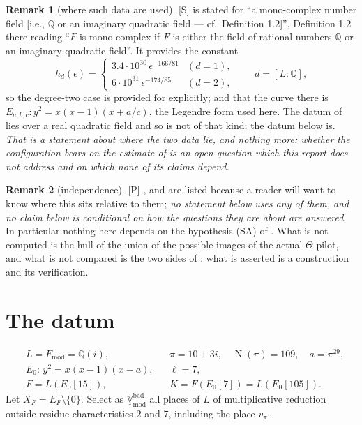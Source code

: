 \documentclass[11pt]{article}
\theoremstyle{plain}
\theoremstyle{definition}
\newtheorem{remark}{Remark}
\newcommand{\Fmod}{F_{\mathrm{mod}}}
\newcommand{\Vbad}{\underline{\mathbb{V}}^{\mathrm{bad}}}
\newcommand{\SA}{\textup{(SA)}}
\newcommand{\Norm}{\operatorname{N}}
\begin{document}
\begin{remark}[where such data are used]\label{r:mfhmp}
\textup{[S]} \cite[Thm.~A]{MFHMP} is stated for ``a mono-complex number field
[i.e., $\mathbb{Q}$ or an imaginary quadratic field --- cf.\ Definition 1.2]'',
Definition 1.2 there reading ``$F$ is mono-complex if $F$ is either the field of
rational numbers $\mathbb{Q}$ or an imaginary quadratic field''.  It provides the
constant
\[
 h_d(\epsilon)=
 \begin{cases}
  3.4\cdot10^{30}\,\epsilon^{-166/81} & (d=1),\\
  6\cdot10^{31}\,\epsilon^{-174/85} & (d=2),
 \end{cases}
 \qquad d=[L:\mathbb{Q}],
\]
so the degree-two case is provided for explicitly; and that the curve there is
$E_{a,b,c}:y^2=x(x-1)(x+a/c)$, the Legendre form used here.  The datum of
\cite{First} lies over a real quadratic field and so is not of that kind; the datum
below is.  \emph{That is a statement about where the two data lie, and nothing more:
whether the configuration bears on the estimate of \cite[Thm.~A]{MFHMP} is an open
question which this report does not address and on which none of its claims depend.}
\end{remark}

\begin{remark}[independence]\label{r:indep}
\textup{[P]} \cite{SS}, \cite{Rpt} and \cite{LANA} are listed because a reader will
want to know where this sits relative to them; \emph{no statement below uses any of
them, and no claim below is conditional on how the questions they are about are
answered}.  In particular nothing here depends on the hypothesis \SA{} of
\cite{First}.  What is not computed is the hull of the union of the possible images
of the actual $\Theta$-pilot, and what is not compared is the two sides of
\cite[Cor.~3.12]{IUT3}: what is asserted is a construction and its verification.
\end{remark}

\section{The datum}\label{s:datum}

\begin{equation}\label{e:datum}
\begin{aligned}
 &L=\Fmod=\mathbb{Q}(i), &&\pi=10+3i,\quad \Norm(\pi)=109,\quad a=\pi^{29},\\
 &E_0:\,y^2=x(x-1)(x-a), &&\ell=7,\\
 &F=L(E_0[15]), &&K=F(E_0[7])=L(E_0[105]).
\end{aligned}
\end{equation}
Let $X_F=E_F\setminus\{0\}$.  Select as $\Vbad_{\mathrm{mod}}$ all places of $L$ of
multiplicative reduction outside residue characteristics $2$ and $7$, including the
place $v_\pi$.
\end{document}
